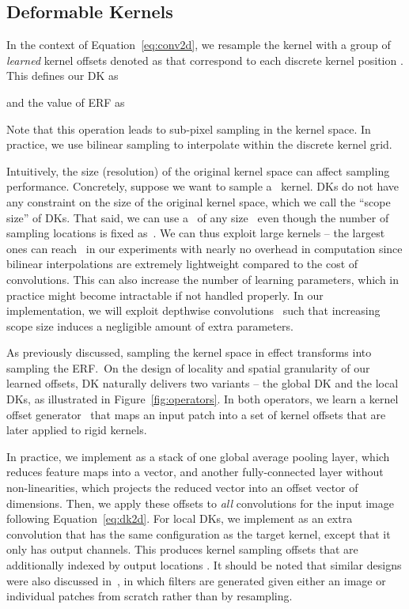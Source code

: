 \documentclass{article} \usepackage{iclr2020_conference, times}
\begin{document}
\subsection{Deformable Kernels} \label{sec:dk}

In the context of Equation~\ref{eq:conv2d}, we resample the kernel
 with a group of \textit{learned} kernel offsets denoted as  that correspond to each discrete kernel position .
This defines our DK as

and the value of ERF as

Note that this operation leads to sub-pixel sampling in the kernel space.
In practice, we use bilinear sampling to interpolate within the discrete kernel
grid.

Intuitively, the size (resolution) of the original kernel space can
affect sampling performance.
Concretely, suppose we want to sample a~ kernel.
DKs do not have any constraint on the size of the original kernel space, which
we call the ``scope size'' of DKs.
That said, we can use a~ of any size~ even though the number of
sampling locations is fixed as~.
We can thus exploit large kernels -- the largest ones can reach~ in
our experiments with nearly no overhead in computation since bilinear
interpolations are extremely lightweight compared to the cost of
convolutions.
This can also increase the number of learning parameters, which in practice
might become intractable if not handled properly.
In our implementation, we will exploit depthwise
convolutions~\citep{howard2017mobilenets} such that increasing scope size
induces a negligible amount of extra parameters.

As previously discussed, sampling the kernel space in effect transforms into
sampling the ERF.\
On the design of locality and spatial granularity of our learned offsets,
DK naturally delivers two variants -- the global DK and the local DKs, as
illustrated in Figure~\ref{fig:operators}.
In both operators, we learn a kernel offset generator~ that maps an input
patch into a set of kernel offsets that are later applied to rigid kernels.

In practice, we implement  as a stack of one global
average pooling layer, which reduces feature maps into a vector, and another
fully-connected layer without non-linearities, which projects the reduced
vector into an offset vector of  dimensions.
Then, we apply these offsets to \textit{all} convolutions for the input image
following Equation~\ref{eq:dk2d}.
For local DKs, we implement  as an extra convolution that
has the same configuration as the target kernel, except that it only has 
output channels.
This produces kernel sampling offsets  that are additionally
indexed by output locations .
It should be noted that similar designs were also discussed
in~\citet{jia2016dynamic}, in which filters are generated given either an image
or individual patches from scratch rather than by resampling.
\end{document}

